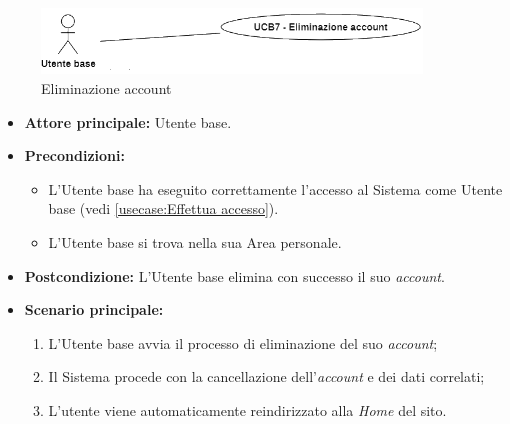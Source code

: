 \newpage
{}
\label{usecase:Eliminazione account}

\begin{figure}[h]
	\centering
	\includegraphics[width=0.9\textwidth]{./uml/UCB7.png} 
	\caption{Eliminazione account}
	\label{fig:UCB7}
  \end{figure}

\begin{itemize}
	\item \textbf{Attore principale:} Utente base.

	\item \textbf{Precondizioni:}
	      \begin{itemize}
		      \item L'Utente base ha eseguito correttamente l'accesso al Sistema come Utente base (vedi \autoref{usecase:Effettua accesso}).
		      \item L'Utente base si trova nella sua Area personale.
	      \end{itemize}

	\item \textbf{Postcondizione:} L'Utente base elimina con successo il suo \textit{account}.

	\item \textbf{Scenario principale:}
	      \begin{enumerate}
		      \item L'Utente base avvia il processo di eliminazione del suo \textit{account};
		      \item Il Sistema procede con la cancellazione dell'\textit{account} e dei dati correlati;
		      \item L'utente viene automaticamente reindirizzato alla \textit{Home} del sito.
	      \end{enumerate}
\end{itemize}

